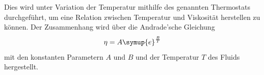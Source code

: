 Dies wird unter Variation der Temperatur mithilfe des genannten Thermostats durchgeführt, um eine Relation zwischen 
Temperatur und Viskosität herstellen zu können. 
Der Zusammenhang wird über die Andrade'sche Gleichung 
\begin{equation}
    \eta = A \symup{e}^{\frac{B}{T}}
    \label{eqn:andrade}
\end{equation}
mit den konstanten Parametern $A$ und $B$ und der Temperatur $T$ des Fluids hergestellt. 
